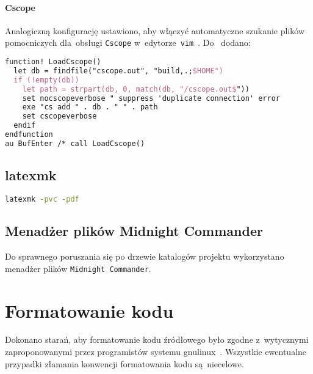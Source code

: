 \documentclass[thesis]{subfiles}
\begin{document}
\paragraph{Cscope}

Analogiczną konfigurację ustawiono, aby włączyć automatyczne szukanie plików pomocniczych dla~obsługi \texttt{Cscope} w~edytorze~\texttt{vim}~\cite{cscope,cscope-autoload}. Do~ dodano:
\begin{lstlisting}[language=tex,numbers=none,caption={Konfiguracja \texttt{Cscope} w~\texttt{.vimrc}}]
function! LoadCscope()
  let db = findfile("cscope.out", "build,.;$HOME")
  if (!empty(db))
    let path = strpart(db, 0, match(db, "/cscope.out$"))
    set nocscopeverbose " suppress 'duplicate connection' error
    exe "cs add " . db . " " . path
    set cscopeverbose
  endif
endfunction
au BufEnter /* call LoadCscope()
\end{lstlisting}


\subsection{latexmk}

\begin{lstlisting}[language=bash,numbers=none,caption={Uruchomienie ciągłej kompilacji \LaTeX do PDF}]
latexmk -pvc -pdf
\end{lstlisting}


\subsection{Menadżer plików Midnight Commander}

Do sprawnego poruszania się po drzewie katalogów projektu wykorzystano menadżer plików \texttt{Midnight~Commander}.


\section{Formatowanie kodu}

Dokonano starań, aby formatowanie kodu źródłowego było zgodne z~wytycznymi zaproponowanymi przez programistów  systemu \gls{gnulinux}~\cite{kernel-coding-style}. Wszystkie ewentualne przypadki złamania konwencji formatowania kodu są~niecelowe.
\end{document}

